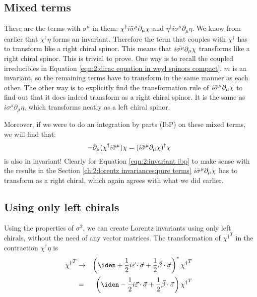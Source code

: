 \subsection{Mixed terms}
\label{ch:2:lorentz invariances:mixed terms}
These are the terms with $\sigma^\mu$ in them: $\chi^\dagger i \Bar{\sigma}^\mu \partial_\mu \chi$ and $\eta^\dagger i \sigma^\mu \partial_\mu \eta$. We know from earlier that $\chi^\dagger\eta$ forms an invariant. Therefore the term that couples with $\chi^\dagger$ has to transform like a right chiral spinor. This means that $i\Bar{\sigma^\mu}\partial_\mu\chi$ transforms like a right chiral spinor. This is trivial to prove. One way is to recall the coupled irreducibles in Equation \ref{eqn:2:dirac equation in weyl spinors compact}. $m$ is an invariant, so the remaining terms have to transform in the same manner as each other. The other way is to explicitly find the transformation rule of $i \Bar{\sigma}^\mu \partial_\mu \chi$ to find out that it does indeed transform as a right chiral spinor. It is the same as $i \sigma^\mu \partial_\mu \eta$, which transforms neatly as a left chiral spinor.

Moreover, if we were to do an integration by parts (IbP) on these mixed terms, we will find that:
\begin{equation}
    - \partial_\mu(\chi^\dagger i \Bar{\sigma}^\mu) \chi = (i \Bar{\sigma}^\mu \partial_\mu \chi)^\dagger \chi
    \label{eqn:2:invariant ibp}
\end{equation}
is also in invariant! Clearly for Equation \ref{eqn:2:invariant ibp} to make sense with the results in the Section \ref{ch:2:lorentz invariances:pure terms} $i \Bar{\sigma}^\mu \partial_\mu \chi$ has to transform as a right chiral, which again agrees with what we did earlier.

\subsection{Using only left chirals}
\label{ch:2:lorentz invariances:using sigma2}
Using the properties of $\sigma^2$, we can create Lorentz invariants using only left chirals, without the need of any vector matrices. The transformation of ${\chi^\dagger}^T$ in the contraction $\chi^\dagger\eta$ is
\begin{eqnarray}
    {\chi^\dagger}^T &\rightarrow& \lc \iden + \frac{1}{2} i \Vec{\varepsilon} \cdot \Vec{\sigma} + \frac{1}{2} \Vec{\beta} \cdot \Vec{\sigma} \rc^* {\chi^\dagger}^T \nonext
    &=& \lc \iden - \frac{1}{2} i \Vec{\varepsilon} \cdot \Vec{\sigma} + \frac{1}{2} \Vec{\beta} \cdot \Vec{\sigma} \rc {\chi^\dagger}^T
    \label{eqn:2:left chiral dagger transformation}
\end{eqnarray}

